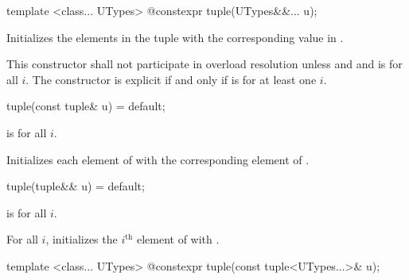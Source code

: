 %
\begin{itemdecl}
template <class... UTypes> @\EXPLICIT@ constexpr tuple(UTypes&&... u);
\end{itemdecl}

\begin{itemdescr}
\pnum
\effects Initializes the elements in the tuple with the
corresponding value in .

\pnum
\remarks This constructor shall not participate in overload resolution unless
 \tcode{==}  and
 and 
is  for all $i$. The constructor is explicit if and only if
 is 
for at least one $i$.
\end{itemdescr}

%
\begin{itemdecl}
tuple(const tuple& u) = default;
\end{itemdecl}

\begin{itemdescr}
\pnum
\requires {} is  for all $i$.

\pnum
\effects Initializes each element of  with the
corresponding element of .
\end{itemdescr}

%
\begin{itemdecl}
tuple(tuple&& u) = default;
\end{itemdecl}

\begin{itemdescr}
\pnum
\requires {} is  for all $i$.

\pnum
\effects For all $i$, initializes the $i^\text{th}$ element of  with
.
\end{itemdescr}

%
\begin{itemdecl}
template <class... UTypes> @\EXPLICIT@ constexpr tuple(const tuple<UTypes...>& u);
\end{itemdecl}

